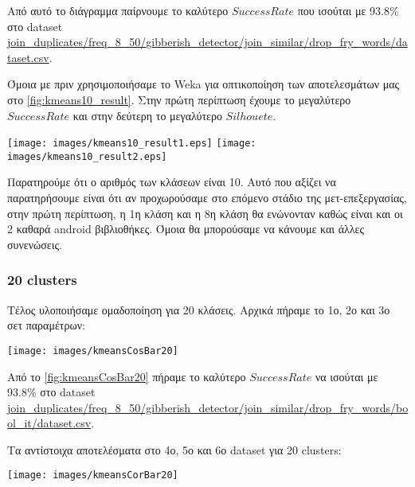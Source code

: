 Από αυτό το διάγραμμα παίρνουμε το καλύτερο $SuccessRate$ που ισούται με 93.8\% στο dataset \url{join_duplicates/freq_8_50/gibberish_detector/join_similar/drop_fry_words/dataset.csv}.

Όμοια με πριν χρησιμοποιήσαμε το Weka για οπτικοποίηση των αποτελεσμάτων μας
στο \hyperref[fig:kmeans10_result]{\figurename{} \ref{fig:kmeans10_result}}.
Στην πρώτη περίπτωση έχουμε το μεγαλύτερο $Success Rate$ και στην δεύτερη το μεγαλύτερο $Silhouete$.

\noindent\begin{minipage}{\linewidth}
    \centering
    \texttt{[image: images/kmeans10\_result1.eps]}
    \texttt{[image: images/kmeans10\_result2.eps]}
    \label{fig:kmeans10_result}
\end{minipage}

Παρατηρούμε ότι ο αριθμός των κλάσεων είναι 10. Αυτό που αξίζει να παρατηρήσουμε είναι ότι αν προχωρούσαμε στο επόμενο στάδιο της μετ-επεξεργασίας, στην πρώτη περίπτωση, η 1η κλάση και η 8η κλάση θα ενώνονταν καθώς είναι και οι 2 καθαρά android βιβλιοθήκες. Όμοια θα μπορούσαμε να κάνουμε και άλλες συνενώσεις.

\subsubsection{20 clusters}
Τέλος υλοποιήσαμε ομαδοποίηση για 20 κλάσεις. Αρχικά πήραμε το 1ο, 2ο και 3ο σετ παραμέτρων:

\noindent\begin{minipage}{\linewidth}
    \centering
    \texttt{[image: images/kmeansCosBar20]}
    \label{fig:kmeansCosBar20}
\end{minipage}

Από το
\hyperref[fig:kmeansCosBar20]{\figurename{} \ref{fig:kmeansCosBar20}}
πήραμε το καλύτερο $Success Rate$ να ισούται με 93.8\% στο dataset \url{join_duplicates/freq_8_50/gibberish_detector/join_similar/drop_fry_words/bool_it/dataset.csv}.

Τα αντίστοιχα αποτελέσματα στο 4ο, 5ο και 6ο dataset για 20 clusters:

\noindent\begin{minipage}{\linewidth}
    \centering
    \texttt{[image: images/kmeansCorBar20]}
    \label{fig:kmeansCorBar20}
\end{minipage}

